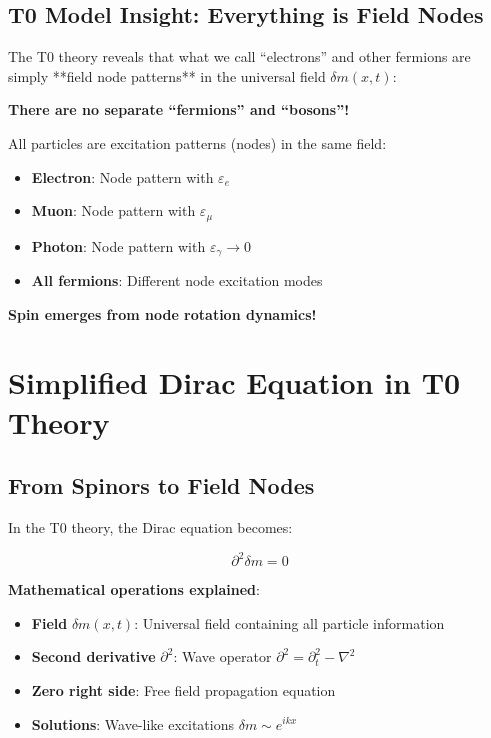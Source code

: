\documentclass[12pt,a4paper]{article}
\newcommand{\deltam}{\delta m}
\theoremstyle{definition}
\theoremstyle{remark}
\begin{document}
	\subsection{T0 Model Insight: Everything is Field Nodes}
	
	The T0 theory reveals that what we call ``electrons'' and other fermions are simply **field node patterns** in the universal field $\deltam(x,t)$:
	
	\begin{tcolorbox}[colback=blue!5!white,colframe=blue!75!black,title=Revolutionary Insight]
		\textbf{There are no separate ``fermions'' and ``bosons''!}
		
		All particles are excitation patterns (nodes) in the same field:
		\begin{itemize}
			\item \textbf{Electron}: Node pattern with $\varepsilon_e$
			\item \textbf{Muon}: Node pattern with $\varepsilon_\mu$
			\item \textbf{Photon}: Node pattern with $\varepsilon_\gamma \to 0$
			\item \textbf{All fermions}: Different node excitation modes
		\end{itemize}
		
		\textbf{Spin emerges from node rotation dynamics!}
	\end{tcolorbox}
	
	\section{Simplified Dirac Equation in T0 Theory}
	
	\subsection{From Spinors to Field Nodes}
	
	In the T0 theory, the Dirac equation becomes:
	
	\begin{equation}
		\boxed{\partial^2 \deltam = 0}
		\label{eq:simplified_dirac}
	\end{equation}
	
	\textbf{Mathematical operations explained}:
	\begin{itemize}
		\item \textbf{Field} $\deltam(x,t)$: Universal field containing all particle information
		\item \textbf{Second derivative} $\partial^2$: Wave operator $\partial^2 = \partial_t^2 - \nabla^2$
		\item \textbf{Zero right side}: Free field propagation equation
		\item \textbf{Solutions}: Wave-like excitations $\deltam \sim e^{ikx}$
	\end{itemize}
	
\end{document}
